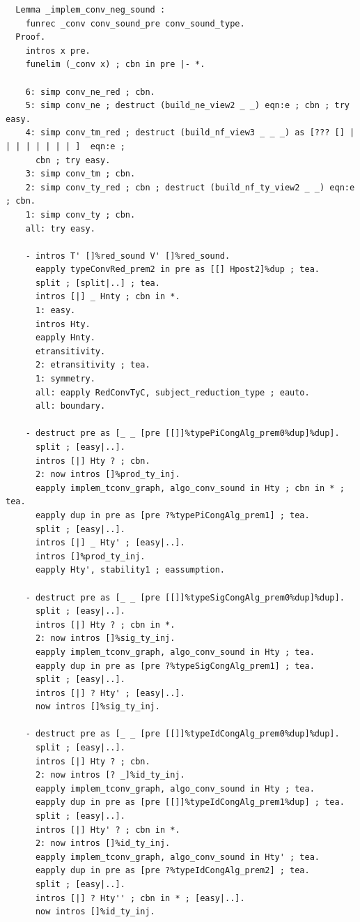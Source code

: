 \begin{lstlisting}
  Lemma _implem_conv_neg_sound :
    funrec _conv conv_sound_pre conv_sound_type.
  Proof.
    intros x pre.
    funelim (_conv x) ; cbn in pre |- *.
    
    6: simp conv_ne_red ; cbn.
    5: simp conv_ne ; destruct (build_ne_view2 _ _) eqn:e ; cbn ; try easy.
    4: simp conv_tm_red ; destruct (build_nf_view3 _ _ _) as [??? [] | | | | | | | | ]  eqn:e ;
      cbn ; try easy.
    3: simp conv_tm ; cbn.
    2: simp conv_ty_red ; cbn ; destruct (build_nf_ty_view2 _ _) eqn:e ; cbn.
    1: simp conv_ty ; cbn.
    all: try easy.
    
    - intros T' []%red_sound V' []%red_sound.
      eapply typeConvRed_prem2 in pre as [[] Hpost2]%dup ; tea.
      split ; [split|..] ; tea.
      intros [|] _ Hnty ; cbn in *.
      1: easy.
      intros Hty.
      eapply Hnty.
      etransitivity.
      2: etransitivity ; tea.
      1: symmetry. 
      all: eapply RedConvTyC, subject_reduction_type ; eauto.
      all: boundary.

    - destruct pre as [_ _ [pre [[]]%typePiCongAlg_prem0%dup]%dup].
      split ; [easy|..].
      intros [|] Hty ? ; cbn.
      2: now intros []%prod_ty_inj.
      eapply implem_tconv_graph, algo_conv_sound in Hty ; cbn in * ; tea.
      eapply dup in pre as [pre ?%typePiCongAlg_prem1] ; tea.
      split ; [easy|..].
      intros [|] _ Hty' ; [easy|..].
      intros []%prod_ty_inj.
      eapply Hty', stability1 ; eassumption.

    - destruct pre as [_ _ [pre [[]]%typeSigCongAlg_prem0%dup]%dup].
      split ; [easy|..].
      intros [|] Hty ? ; cbn in *.
      2: now intros []%sig_ty_inj.
      eapply implem_tconv_graph, algo_conv_sound in Hty ; tea.
      eapply dup in pre as [pre ?%typeSigCongAlg_prem1] ; tea.
      split ; [easy|..].
      intros [|] ? Hty' ; [easy|..].
      now intros []%sig_ty_inj.
    
    - destruct pre as [_ _ [pre [[]]%typeIdCongAlg_prem0%dup]%dup].
      split ; [easy|..].
      intros [|] Hty ? ; cbn.
      2: now intros [? _]%id_ty_inj.
      eapply implem_tconv_graph, algo_conv_sound in Hty ; tea.
      eapply dup in pre as [pre [[]]%typeIdCongAlg_prem1%dup] ; tea.
      split ; [easy|..].
      intros [|] Hty' ? ; cbn in *.
      2: now intros []%id_ty_inj.
      eapply implem_tconv_graph, algo_conv_sound in Hty' ; tea.
      eapply dup in pre as [pre ?%typeIdCongAlg_prem2] ; tea.
      split ; [easy|..].
      intros [|] ? Hty'' ; cbn in * ; [easy|..].
      now intros []%id_ty_inj.


\end{lstlisting}
